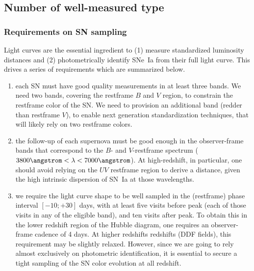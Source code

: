 \subsection{Number of well-measured type \sne}

\subsubsection{Requirements on SN sampling}
\label{sec:sn_sampling_requirements}

Light curves are the essential ingredient to (1) measure standardized
luminosity distances and (2) photometrically identify SNe~Ia from
their full light curve. This drives a series of requirements which are
summarized below.

\begin{enumerate}

\item each SN must have good quality measurements in at least three
  bands. We need two bands, covering the restframe $B$ and $V$ region,
  to constrain the restframe color of the SN. We need to provision an
  additional band (redder than restframe $V$), to enable next
  generation standardization techniques, that will likely rely on two
  restframe colors.

\item the follow-up of each supernova must be good enough in the
  observer-frame bands that correspond to the $B$- and $V$-restframe
  spectrum ($3800 \angstrom < \lambda < 7000 \angstrom$).  At
  high-redshift, in particular, one should avoid relying on the $UV$
  restframe region to derive a distance, given the high intrinsic
  dispersion of SN~Ia at those wavelengths.
  
\item we require the light curve shape to be well sampled in the
  (restframe) phase interval $[-10;+30]$ days, with at least five
  visits before peak (each of those visits in any of the eligible
  band), and ten visits after peak.  To obtain this in the lower
  redshift region of the Hubble diagram, one requires an
  observer-frame cadence of 4 days.  At higher redshifts redshifts
  (DDF fields), this requirement may be slightly relaxed. However,
  since we are going to rely almost exclusively on photometric
  identification, it is essential to secure a tight sampling of the SN
  color evolution at all redshift.
  

\end{enumerate}
